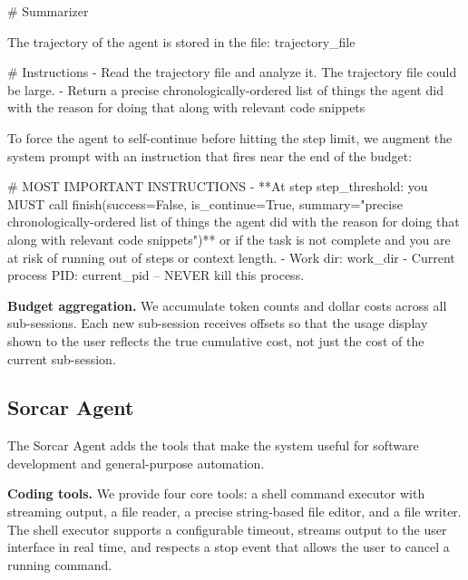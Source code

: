 \documentclass{article}
\begin{document}
\begin{prompt}
# Summarizer

The trajectory of the agent is stored in the file: {trajectory_file}

# Instructions
- Read the trajectory file and analyze it.  The trajectory file
  could be large.
- Return a precise chronologically-ordered list of things the
  agent did with the reason for doing that along with relevant
  code snippets
\end{prompt}

\noindent To force the agent to self-continue before hitting the step limit,
we augment the system prompt with an instruction that fires near the
end of the budget:

\begin{prompt}
# MOST IMPORTANT INSTRUCTIONS
- **At step {step_threshold}: you MUST call
  finish(success=False, is_continue=True,
  summary="precise chronologically-ordered list of things
  the agent did with the reason for doing that along with
  relevant code snippets")** or if the task is not complete
  and you are at risk of running out of steps or context
  length.
- Work dir: {work_dir}
- Current process PID: {current_pid} -- NEVER kill this
  process.
\end{prompt}

\textbf{Budget aggregation.}  We accumulate token counts and dollar
costs across all sub-sessions.  Each new sub-session receives
offsets so that the usage display shown to the user reflects the true
cumulative cost, not just the cost of the current sub-session.

\subsection{Sorcar Agent}
\label{sec:sorcar-agent}

The Sorcar Agent adds the tools that make the system useful for
software development and general-purpose automation.

\textbf{Coding tools.}  We provide four core tools: a shell command
executor with streaming output, a file reader, a precise string-based
file editor, and a file writer.  The shell executor supports a
configurable timeout, streams output to the user interface in real
time, and respects a stop event that allows the user to cancel a
running command.
\end{document}
